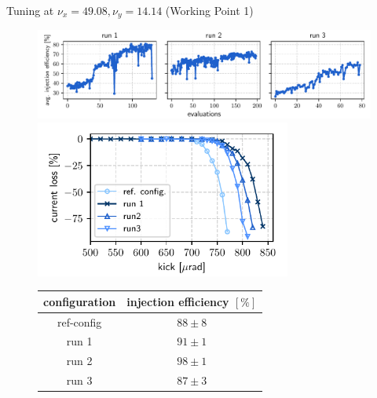 \documentclass[aspectratio=169]{beamer}
\begin{document}
\begin{frame}{Tuning at $\nu_x = 49.08, \nu_y = 14.14$ (Working Point 1)}
    \begin{minipage}{0.55\textwidth}
        \begin{figure}
            \centering
            \includegraphics[width=\textwidth]{oldtunes_history.pdf}
            \includegraphics[width = 0.75\textwidth]{WEPL087_f1.pdf}
            \vfill
            \scriptsize
            \begin{table}[]
                \begin{tabular}{cc}
                \hline
                configuration & injection efficiency $[\%]$ \\ \hline
                ref-config    & $88\pm8$                    \\
                run 1         & $91\pm1$                    \\
                run 2         & $98\pm1$                     \\
                run 3         & $87\pm3$                     \\ \hline
                \end{tabular}
                \end{table}
        \end{figure}
    \end{minipage}
    \hfill
    \begin{minipage}{0.44\textwidth}
        \begin{figure}
            \centering

\end{figure}
\end{minipage}
\end{frame}
\end{document}
